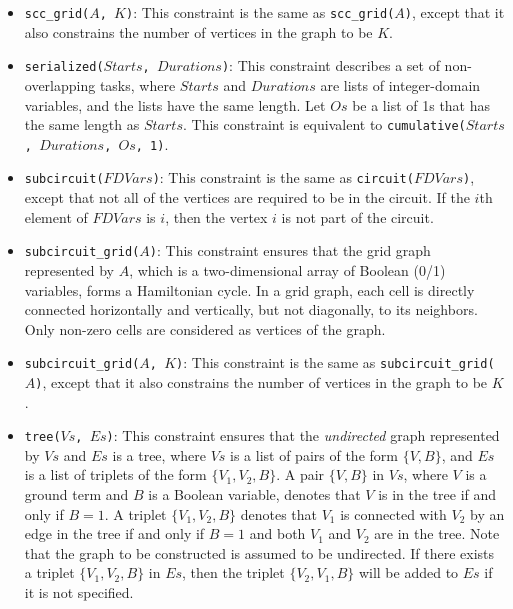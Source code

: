 \begin{itemize}
\begin{verbatim}
    neibs(A, NRows, NCols, R, C) = 
        [(R1,C1) : (R1,C1) in [(R-1,C), (R+1,C), 
                               (R,C-1), (R,C+1)],
                    R1 >= 1, R1 =< NRows,
                    C1 >= 1, C1 =< NCols, 
                    A[R1,C1] !== 0].
\end{verbatim}
Note that there is an edge between each pair of neighboring cells in the resulting graph as long as the cells are in the graph.

\item \texttt{scc\_grid($A$, $K$)}: This constraint is the same as \texttt{scc\_grid($A$)}, except that it also constrains the number of vertices in the graph to be $K$. 

\item \texttt{serialized($Starts$, $Durations$)}: This constraint describes a set of non-overlapping tasks, where $Starts$ and $Durations$ are lists of integer-domain variables, and the lists have the same length. Let $Os$ be a list of 1s that has the same length as $Starts$. This constraint is equivalent to \texttt{cumulative($Starts$, $Durations$, $Os$, 1)}.

\item \texttt{subcircuit($FDVars$)}: This constraint is the same as \texttt{circuit($FDVars$)}, except that not all of the vertices are required to be in the circuit. If the $i$th element of $FDVars$ is $i$, then the vertex $i$ is not part of the circuit. 

\item \texttt{subcircuit\_grid($A$)}: This constraint ensures that the grid graph represented by $A$, which is a two-dimensional array of Boolean (0/1) variables, forms a Hamiltonian cycle. In a grid graph, each cell is directly connected horizontally and vertically, but not diagonally, to its neighbors. Only non-zero cells are considered as vertices of the graph.

\item \texttt{subcircuit\_grid($A$, $K$)}: This constraint is the same as \texttt{subcircuit\_grid($A$)}, except that it also constrains the number of vertices in the graph to be $K$.

\item \texttt{tree($Vs$, $Es$)}: This constraint ensures that the \textit{undirected} graph represented by $Vs$ and $Es$ is a tree, where $Vs$ is a list of pairs of the form $\{V,B\}$, and $Es$ is a list of triplets of the form $\{V_1,V_2,B\}$. A pair $\{V,B\}$ in $Vs$, where $V$ is a ground term and $B$ is a Boolean variable, denotes that $V$ is in the tree if and only if $B = 1$. A triplet $\{V_1,V_2,B\}$ denotes that $V_1$ is connected with $V_2$  by an edge in the tree if and only if $B = 1$ and both $V_1$ and $V_2$ are in the tree. Note that the graph to be constructed is assumed to be undirected. If there exists a triplet $\{V_1,V_2,B\}$ in $Es$, then the triplet $\{V_2,V_1,B\}$ will be added to $Es$ if it is not specified.


\end{itemize}

